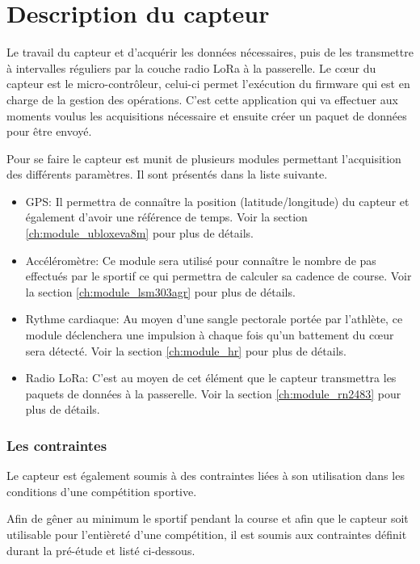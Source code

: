 \chapter{Description du capteur}\label{ch:capteur}

Le travail du capteur et d'acquérir les données nécessaires, puis de les transmettre à intervalles réguliers par la couche radio LoRa à la passerelle. Le cœur du capteur est le micro-contrôleur, celui-ci permet l'exécution du firmware qui est en charge de la gestion des opérations. C'est cette application qui va effectuer aux moments voulus les acquisitions nécessaire et ensuite créer un paquet de données pour être  envoyé.

Pour se faire le capteur est munit de plusieurs modules permettant l'acquisition des différents paramètres. Il sont présentés dans la liste suivante.

\begin{itemize}
\item GPS: Il permettra de connaître la position (latitude/longitude) du capteur et également d'avoir une référence de temps. Voir la section \ref{ch:module_ubloxeva8m} pour plus de détails.
\item Accéléromètre: Ce module sera utilisé pour connaître le nombre de pas effectués par le sportif ce qui permettra de calculer sa cadence de course. Voir la section \ref{ch:module_lsm303agr} pour plus de détails.
\item Rythme cardiaque:  Au moyen d'une sangle pectorale portée par l'athlète, ce module déclenchera une impulsion à chaque fois qu'un battement du cœur sera détecté. Voir la section \ref{ch:module_hr} pour plus de détails.
\item Radio LoRa: C'est au moyen de cet élément que le capteur transmettra les paquets de données à la passerelle. Voir la section \ref{ch:module_rn2483} pour plus de détails.
\end{itemize}

\subsection{Les contraintes}

Le capteur est également soumis à des contraintes liées à son utilisation dans les conditions d'une compétition sportive.

Afin de gêner au minimum le sportif pendant la course et afin que le capteur soit utilisable pour l'entièreté d'une compétition, il est soumis aux contraintes définit durant la pré-étude et listé ci-dessous.

